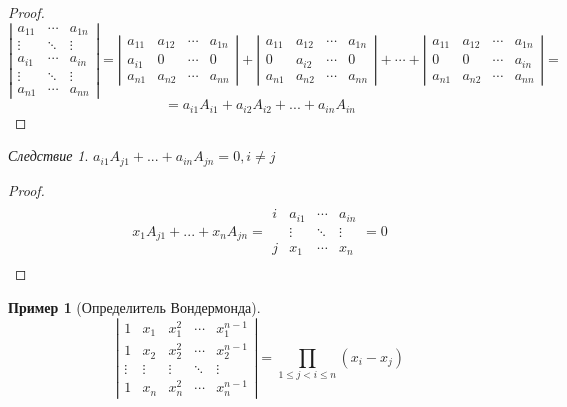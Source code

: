 \documentclass[12pt]{article}
\theoremstyle{definition} %
\newtheorem{Example}[Thm]{Пример} %
\theoremstyle{plain} %
\theoremstyle{remark} %
\newtheorem{Cons}[Thm]{Следствие} %
\begin{document}
{\begin{proof}
    $$\left|\begin{array}{ccc}
    a_{11} & \cdots & a_{1n} \\ 
    \vdots & \ddots & \vdots \\ 
    a_{i1} & \cdots & a_{in} \\ 
    \vdots & \ddots & \vdots \\ 
    a_{n1} & \cdots & a_{nn}
    \end{array}\right| = \left|\begin{array}{cccc}
    a_{11} & a_{12} & \cdots & a_{1n} \\ 
    a_{i1} & 0 & \cdots & 0 \\ 
    a_{n1} & a_{n2} & \cdots & a_{nn}
    \end{array}\right| + \left|\begin{array}{cccc}
    a_{11} & a_{12} & \cdots & a_{1n} \\ 
    0 & a_{i2} & \cdots & 0 \\ 
    a_{n1} & a_{n2} & \cdots & a_{nn}
    \end{array}\right| + \cdots + \left|\begin{array}{cccc}
    a_{11} & a_{12} & \cdots & a_{1n} \\ 
    0 & 0 & \cdots & a_{in} \\ 
    a_{n1} & a_{n2} & \cdots & a_{nn}
    \end{array}\right| =$$
    \[= a_{i1} A_{i1} + a_{i2} A_{i2} + ... + a_{in} A_{in}\] 
\end{proof}

\begin{Cons}
    $a_{i1} A_{j1} + ... + a_{in} A_{jn} = 0, i \neq j$ 
\end{Cons}

\begin{proof}
    \[x_1 A_{j1} + ... + x_n A_{jn} = \begin{array}{c|ccc|}
        &  &  &  \\ 
       i & a_{i1} & \cdots & a_{in} \\ 
        & \vdots & \ddots & \vdots \\ 
       j & x_1 & \cdots & x_n \\ 
        &  &  & 
       \end{array} = 0\]
\end{proof}

\begin{Example}[Определитель Вондермонда]
    \[\left|\begin{array}{ccccc}
    1 & x_1 & x_1^2 & \cdots & x_1^{n - 1} \\ 
    1 & x_2 & x_2^2 & \cdots & x_2^{n - 1} \\ 
    \vdots & \vdots & \vdots & \ddots & \vdots \\ 
    1 & x_n & x_n^2 & \cdots & x_n^{n - 1}
    \end{array}\right| = \prod_{1 \leqslant j < i \leqslant n} (x_i - x_j)\]    
\end{Example}

}
\end{document}
